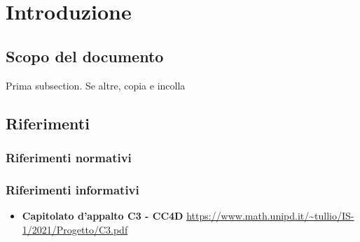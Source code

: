	\section{Introduzione}
		\subsection {Scopo del documento} Prima subsection. Se altre, copia e incolla
		\subsection {Riferimenti} 
			\subsubsection {Riferimenti normativi} 
			\subsubsection {Riferimenti informativi} 
			\begin{itemize}
				\item \textbf{Capitolato d'appalto C3 - CC4D}\newline
				\url{https://www.math.unipd.it/~tullio/IS-1/2021/Progetto/C3.pdf}
			\end{itemize}